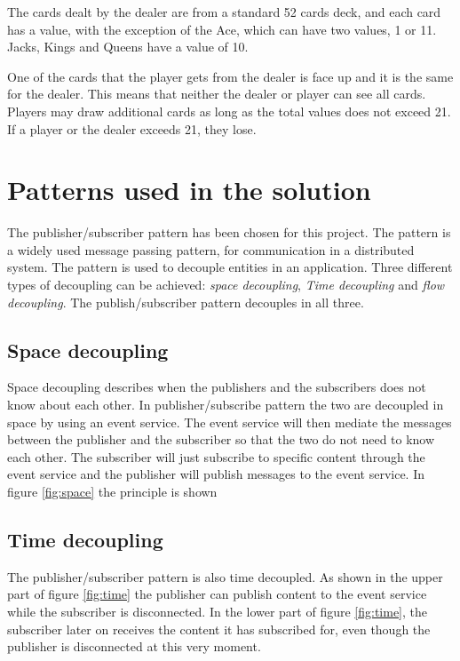 The cards dealt by the dealer are from a standard 52 cards deck, and each card has a value, with the exception of the Ace, which can have two values, 1 or 11. Jacks, Kings and Queens have a value of 10.  

One of the cards that the player gets from the dealer is face up and it is the same for the dealer. This means that neither the dealer or player can see all cards. Players may draw additional cards as long as the total values does not exceed 21. If a player or the dealer exceeds 21, they lose. 

\section{Patterns used in the solution}
\label{chp:patterns}
The publisher/subscriber pattern has been chosen for this project. The pattern is a widely used message passing pattern, for communication in a distributed system. The pattern is used to decouple entities in an application. Three different types of decoupling can be achieved: \emph{space decoupling}, \emph{Time decoupling} and \emph{flow decoupling}. The publish/subscriber pattern decouples in all three.

\subsection{Space decoupling}
Space decoupling describes when the publishers and the subscribers does not know about each other. In publisher/subscribe pattern the two are decoupled in space by using an event service. The event service will then mediate the messages between the publisher and the subscriber so that the two do not need to know each other. The subscriber will just subscribe to specific content through the event service and the publisher will publish messages to the event service. In figure \ref{fig:space} the principle is shown


\subsection{Time decoupling}
The publisher/subscriber pattern is also time decoupled. As shown in the upper part of figure \ref{fig:time} the publisher can publish content to the event service while the subscriber is disconnected. In the lower part of figure \ref{fig:time}, the subscriber later on receives the content it has subscribed for, even though the publisher is disconnected at this very moment.

